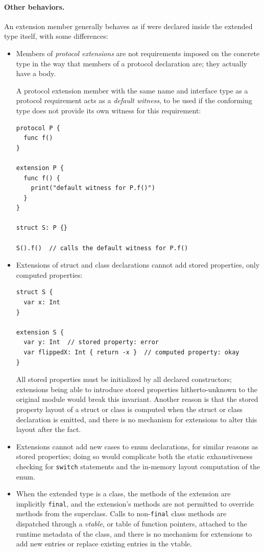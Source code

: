 \documentclass[../generics]{subfiles}
\begin{document}
\paragraph{Other behaviors.} An extension member generally behaves as if were declared inside the extended type itself, with some differences:
\begin{itemize}
\item Members of \emph{protocol extensions} are not requirements imposed on the concrete type in the way that members of a protocol declaration are; they actually have a body.

A protocol extension member with the same name and interface type as a protocol requirement acts as a \emph{default witness}, to be used if the conforming type does not provide its own witness for this requirement:
\begin{Verbatim}
protocol P {
  func f()
}

extension P {
  func f() {
    print("default witness for P.f()")
  }
}

struct S: P {}

S().f()  // calls the default witness for P.f()
\end{Verbatim}
\item Extensions of struct and class declarations cannot add stored properties, only computed properties:
\begin{Verbatim}
struct S {
  var x: Int
}

extension S {
  var y: Int  // stored property: error
  var flippedX: Int { return -x }  // computed property: okay
}
\end{Verbatim}
All stored properties must be initialized by all declared constructors; extensions being able to introduce stored properties hitherto-unknown to the original module would break this invariant. Another reason is that the stored property layout of a struct or class is computed when the struct or class declaration is emitted, and there is no mechanism for extensions to alter this layout after the fact.
\item Extensions cannot add new cases to enum declarations, for similar reasons as stored properties; doing so would complicate both the static exhaustiveness checking for \texttt{switch} statements and the in-memory layout computation of the enum.

\item When the extended type is a class, the methods of the extension are implicitly \texttt{final}, and the extension's methods are not permitted to override methods from the superclass. Calls to non-\texttt{final} class methods are dispatched through a \emph{vtable}, or table of function pointers, attached to the runtime metadata of the class, and there is no mechanism for extensions to add new entries or replace existing entries in the vtable.


\end{itemize}
\end{document}
